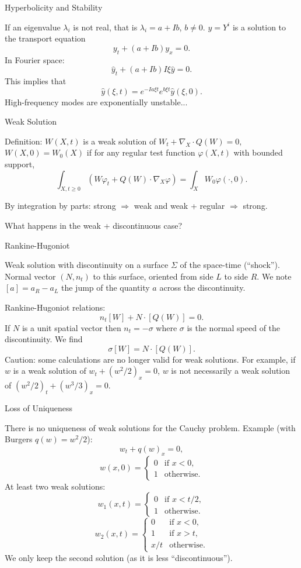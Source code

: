 \documentclass[english]{beamer}
\begin{document}
%
\begin{frame}{Hyperbolicity and Stability}

If an eigenvalue $\lambda_{i}$ is not real, that is $\lambda_{i}=a+Ib$, $b\neq0$. $y=Y^{i}$ is a solution to the transport equation
\[
y_{t}+(a+Ib)y_{x}=0.
\]
In Fourier space:
\[
\hat{y}_{t}+(a+Ib)I\xi\hat{y}=0.
\]
This implies that
\[
\hat{y}(\xi,t)=e^{-Ia\xi t}e^{b\xi t}\hat{y}(\xi,0).
\]
High-frequency modes are exponentially unstable...
\end{frame}
%

\begin{frame}{Weak Solution}

Definition: $W(X,t)$ is a weak solution of $W_{t}+\nabla_{X}\cdot Q(W)=0,$
$W(X,0)=W_{0}(X)$ if for any regular test function $\varphi(X,t)$ with bounded support,
\[
\int_{X,t\geq0}\left(W\varphi_{t}+Q(W)\cdot\nabla_{X}\varphi\right)=\int_{X}W_{0}\varphi(\cdot,0).
\]

By integration by parts: strong $\Rightarrow$ weak and weak
+ regular $\Rightarrow$ strong.

What happens in the weak + discontinuous case?
\end{frame}
%
\begin{frame}{Rankine-Hugoniot}

Weak solution with discontinuity on a surface $\Sigma$ of the space-time
(``shock''). Normal vector $(N,n_{t})$ to this surface, oriented
from side $L$ to side $R$. We note $[a]=a_{R}-a_{L}$ the jump
of the quantity $a$ across the discontinuity.

Rankine-Hugoniot relations:
\[
n_{t}[W]+N\cdot[Q(W)]=0.
\]
If $N$ is a unit spatial vector then $n_{t}=-\sigma$ where
$\sigma$ is the normal speed of the discontinuity. We find
\[
\sigma[W]=N\cdot[Q(W)].
\]
 Caution: some calculations are no longer valid for weak solutions.
For example, if $w$ is a weak solution of $w_{t}+(w^{2}/2)_{x}=0$,
$w$ is not necessarily a weak solution of $(w^{2}/2)_{t}+(w^{3}/3)_{x}=0.$
\end{frame}
%
\begin{frame}{Loss of Uniqueness}

There is no uniqueness of weak solutions for the Cauchy problem.
Example (with Burgers $q(w)=w^{2}/2$):
\[
w_{t}+q(w)_{x}=0,
\]
\[
w(x,0)=\begin{cases}
0 & \text{if }x<0,\\
1 & \text{otherwise.}
\end{cases}
\]
At least two weak solutions:
\[
w_{1}(x,t)=\begin{cases}
0 & \text{if }x<t/2,\\
1 & \text{otherwise.}
\end{cases}
\]
\[
w_{2}(x,t)=\begin{cases}
0 & \text{if }x<0,\\
1 & \text{if }x>t,\\
x/t & \text{otherwise.}
\end{cases}
\]
We only keep the second solution (as it is less ``discontinuous'').
\end{frame}
%
\end{document}
